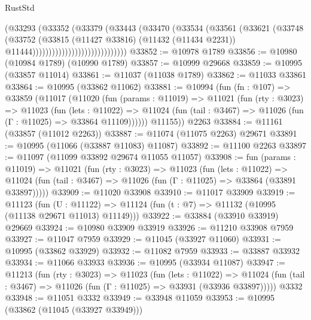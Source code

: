 \begin{lexlean}{RustStd}
\begin{coremodule}
                                        (@33293
                                          (@33352
                                            (@33379
                                              (@33443
                                                (@33470
                                                  (@33534
                                                    (@33561
                                                      (@33621
                                                        (@33748
                                                          (@33752
                                                            (@33815
                                                              (@11427 @33816)
                                                              (@11432 (@11434 @2231))
                                                              @11444)))))))))))))))))))))))))))))
@33852 := @10978 @1789
@33856 := @10980 (@10984 @1789) (@10990 @1789)
@33857 := @10999 @29668
@33859 := @10995 (@33857 @11014)
@33861 := @11037 (@11038 @1789)
@33862 := @11033 @33861
@33864 := @10995 (@33862 @11062)
@33881 := @10994
    (fun (fn : @107) =>
    @33859
      (@11017
        (@11020
          (fun (params : @11019) =>
          @11021
            (fun (rty : @3023) =>
            @11023
              (fun (lets : @11022) =>
              @11024 (fun (tail : @3467) => @11026 (fun (Γ : @11025) => @33864 @11109))))))
        @11155))
    @2263
@33884 := @11161 (@33857 (@11012 @2263))
@33887 := @11074 (@11075 @2263) @29671
@33891 := @10995 (@11066 (@33887 @11083) @11087)
@33892 := @11100 @2263
@33897 := @11097 (@11099 @33892 @29674 @11055 @11057)
@33908 := fun (params : @11019) =>
  @11021
    (fun (rty : @3023) =>
    @11023
      (fun (lets : @11022) =>
      @11024 (fun (tail : @3467) => @11026 (fun (Γ : @11025) => @33864 (@33891 @33897)))))
@33909 := @11020 @33908
@33910 := @11017 @33909
@33919 := @11123
    (fun (U : @11122) => @11124 (fun (t : @7) => @11132 (@10995 (@11138 @29671 @11013) @11149)))
@33922 := @33884 (@33910 @33919) @29669
@33924 := @10980 @33909 @33919
@33926 := @11210 @33908 @7959
@33927 := @11047 @7959
@33929 := @11045 (@33927 @11060)
@33931 := @10995 (@33862 @33929)
@33932 := @11082 @7959
@33933 := @33887 @33932
@33934 := @11066 @33933
@33936 := @10995 (@33934 @11087)
@33947 := @11213
    (fun (rty : @3023) =>
    @11023
      (fun (lets : @11022) =>
      @11024 (fun (tail : @3467) => @11026 (fun (Γ : @11025) => @33931 (@33936 @33897)))))
    @3332
@33948 := @11051 @3332
@33949 := @33948 @11059
@33953 := @10995 (@33862 (@11045 (@33927 @33949)))

\end{coremodule}
\end{lexlean}
